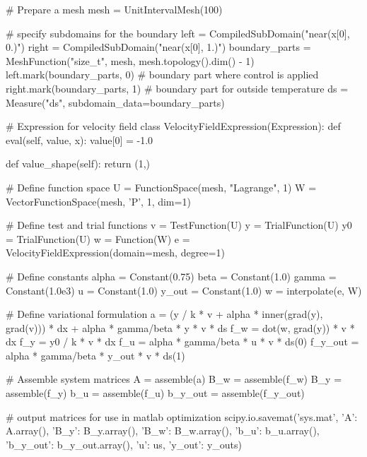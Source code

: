 \documentclass[
12pt, %
a4paper, %
onecolumn, %
portrait %
]{article}
\begin{document}
\begin{python}
# Prepare a mesh
mesh = UnitIntervalMesh(100)

# specify subdomains for the boundary
left = CompiledSubDomain("near(x[0], 0.)")
right = CompiledSubDomain("near(x[0], 1.)")
boundary_parts = MeshFunction("size_t", mesh, mesh.topology().dim() - 1)
left.mark(boundary_parts, 0)    # boundary part where control is applied
right.mark(boundary_parts, 1)   # boundary part for outside temperature
ds = Measure("ds", subdomain_data=boundary_parts)

# Expression for velocity field
class VelocityFieldExpression(Expression):
    def eval(self, value, x):
        value[0] = -1.0

    def value_shape(self):
        return (1,)
        
# Define function space
U = FunctionSpace(mesh, "Lagrange", 1)
W = VectorFunctionSpace(mesh, 'P', 1, dim=1)

# Define test and trial functions
v = TestFunction(U)
y = TrialFunction(U)
y0 = TrialFunction(U)
w = Function(W)
e = VelocityFieldExpression(domain=mesh, degree=1)

# Define constants
alpha = Constant(0.75)
beta = Constant(1.0)
gamma = Constant(1.0e3)
u = Constant(1.0)
y_out = Constant(1.0)
w = interpolate(e, W)

# Define variational formulation
a = (y / k * v + alpha * inner(grad(y), grad(v))) * dx + alpha * gamma/beta * y * v * ds
f_w = dot(w, grad(y)) * v * dx
f_y = y0 / k * v * dx
f_u = alpha * gamma/beta * u * v * ds(0)
f_y_out = alpha * gamma/beta * y_out * v * ds(1)

# Assemble system matrices
A = assemble(a)
B_w = assemble(f_w)
B_y = assemble(f_y)
b_u = assemble(f_u)
b_y_out = assemble(f_y_out)

# output matrices for use in matlab optimization
scipy.io.savemat('sys.mat', {'A': A.array(), 'B_y': B_y.array(), 'B_w': B_w.array(), 'b_u': b_u.array(), 'b_y_out': b_y_out.array(), 'u': us, 'y_out': y_outs})
\end{python}
\end{document}
